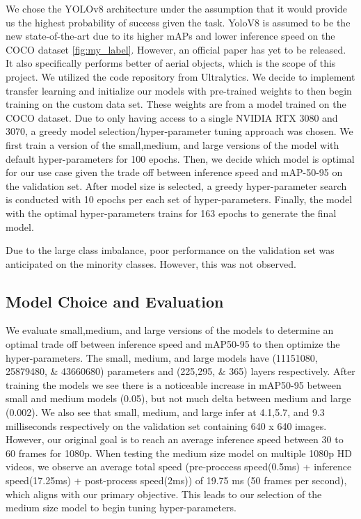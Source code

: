 \documentclass[10pt,twocolumn,letterpaper]{article}
\begin{document}
We chose the YOLOv8 architecture under the assumption that it would provide us the highest probability of success given the task. YoloV8 is 
assumed to be the new state-of-the-art due to its higher mAPs and lower inference speed on the COCO dataset \ref{fig:my_label}. However, an official paper has 
yet to be released. It also specifically performs better of aerial objects, which is the scope of this project. We utilized the code repository 
from Ultralytics. We decide to implement transfer learning and initialize our models with pre-trained weights to then begin training on the 
custom data set. These weights are from a model trained on the COCO dataset. Due to only having access to a single NVIDIA RTX 3080 and 3070, 
a greedy model selection/hyper-parameter tuning approach was chosen. We first train a version of the small,medium, and large versions of the 
model with default hyper-parameters for 100 epochs. Then, we decide which model is optimal for our use case given the trade off between inference 
speed and mAP-50-95 on the validation set. After model size is selected, a greedy hyper-parameter search is conducted with 10 epochs per each 
set of hyper-parameters. Finally, the model with the optimal hyper-parameters trains for 163 epochs to generate the final model.

Due to the large class imbalance, poor performance on the validation set was anticipated on the minority classes. However, this was not observed.

\subsection{Model Choice and Evaluation}

We evaluate small,medium, and large versions of the models to determine an optimal trade off between inference speed and mAP50-95 to then optimize the hyper-parameters. The small, medium, and large models have (11151080, 25879480, & 43660680) parameters and (225,295, & 365) layers respectively. After training the models we see there is a noticeable increase in mAP50-95 between small and medium models (0.05), but not much delta between medium and large (0.002). We also see that small, medium, and large infer at 4.1,5.7, and 9.3 milliseconds respectively on the validation set containing 640 x 640 images. However, our original goal is to reach an average inference speed between 30 to 60 frames for 1080p. When testing the medium size model on multiple 1080p HD videos, we observe an average total speed (pre-proccess speed(0.5ms) + inference speed(17.25ms) + post-process speed(2ms)) of 19.75 ms (50 frames per second), which aligns with our primary objective. This leads to our selection of the medium size model to begin tuning hyper-parameters.
\end{document}
